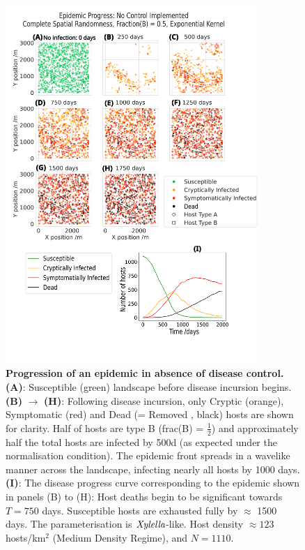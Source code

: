 \documentclass[11pt,letterpaper]{article}
\begin{document}
\begin{figure}[h]
	\centering
	\includegraphics[width=0.854\textwidth]{dpc_highres.png}
	\caption{ \label{epi_nocontrol} \textbf{Progression of an epidemic in absence of disease control.} \textbf{(A)}: Susceptible (green) landscape before disease incursion begins. \textbf{(B)} $\rightarrow$ \textbf{(H)}: Following disease incursion, only Cryptic (orange), Symptomatic (red) and Dead (= Removed , black) hosts are shown for clarity.
		Half of hosts are type B (frac(B) = $\frac{1}{2}$) and approximately half the total hosts are infected by 500d (as expected under the normalisation condition). The epidemic front spreads in a wavelike manner across the landscape, infecting nearly all hosts by 1000 days. \textbf{(I)}: The disease progress curve corresponding to the epidemic shown in panels (B) to (H): Host deaths begin to be significant towards $T = 750$ days. Susceptible hosts are exhausted fully by $\approx$ 1500 days. The parameterisation is $\emph{Xylella}$-like. Host density $\approx 123$ hosts/km$^{2}$ (Medium Density Regime), and $N = 1110$.}
\end{figure}
\end{document}
